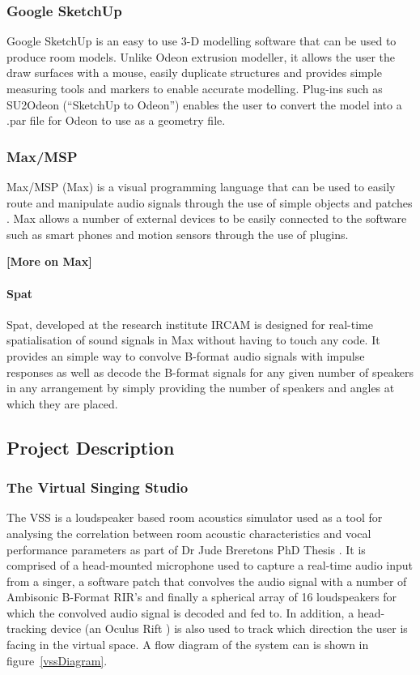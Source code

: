 \documentclass[../../main.tex]{subfiles}
\begin{document}
	\subsubsection{Google SketchUp}\label{GSU}
		Google SketchUp \cite{SKU} is an easy to use 3-D modelling software that can be used to produce room models. Unlike Odeon extrusion modeller, it allows the user the draw surfaces with a mouse, easily duplicate structures and provides simple measuring tools and markers to enable accurate modelling. Plug-ins such as SU2Odeon (``SketchUp to Odeon'') \cite{SU2Odeon} enables the user to convert the model into a .par file for Odeon to use as a geometry file.

	\subsubsection{Max/MSP}
		Max/MSP (Max) is a visual programming language that can be used to easily route and manipulate audio signals through the use of simple objects and patches \cite{max}. Max allows a number of external devices to be easily connected to the software such as smart phones and motion sensors through the use of plugins.

		\begin{center}
			\textbf{[More on Max]}
		\end{center}

		\paragraph{Spat}

			 Spat, developed at the research institute IRCAM \cite{spat} is designed for real-time spatialisation of sound signals in Max without having to touch any code. It provides an simple way to convolve B-format audio signals with impulse responses as well as decode the B-format signals for any given number of speakers in any arrangement by simply providing the number of speakers and angles at which they are placed.

\subsection{Project Description}
	\subsubsection{The Virtual Singing Studio}

		The \ac{VSS} is a loudspeaker based room acoustics simulator used as a tool for analysing the correlation between room acoustic characteristics and vocal performance parameters as part of Dr Jude Breretons PhD Thesis \cite{Brereton2014}. It is comprised of a head-mounted microphone used to capture a real-time audio input from a singer, a software patch that convolves the audio signal with a number of Ambisonic B-Format \ac{RIR}'s and finally a spherical array of 16 loudspeakers for which the convolved audio signal is decoded and fed to. In addition, a head-tracking device (an Oculus Rift \cite{oculus}) is also used to track which direction the user is facing in the virtual space. A flow diagram of the system can is shown in figure~\ref{vssDiagram}.
\end{document}
